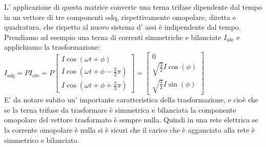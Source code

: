 \documentclass[Lau,noexaminfo]{sapthesis}
\begin{document}
	L' applicazione di questa matrice converte una terna trifase dipendente dal tempo in un vettore di tre componenti odq, rispettivamente omopolare, diretta e quadratura, che rispetto al nuovo sistema d' assi è indipendente dal tempo.\\
	Prendiamo ad esempio una terna di correnti simmetriche e bilanciate $I_{abc}$ e applichiamo la trasformazione:\\
	$I_{odq}=P I_{abc}=P \begin{bmatrix}
	I\cos(\omega t + \phi)\\
	I\cos(\omega t + \phi -\frac{2}{3}\pi) \\
	I\cos(\omega t + \phi +\frac{2}{3}\pi)
	\end{bmatrix}=
	\begin{bmatrix}
	0 \\
	\sqrt{\frac{3}{2}}I\cos(\phi)\\
	\sqrt{\frac{3}{2}}I\sin(\phi)
	\end{bmatrix}
	$\\
	E' da notare subito un' importante caratteristica della trasformazione, e cioè che se la terna trifase da trasformare è simmetrica e bilanciata la componente omopolare del vettore trasformato è sempre nulla. Quindi in una rete elettrica se la corrente omopolare è nulla si è sicuri che il carico che è agganciato alla rete è simmetrico e bilanciato.\newpage
\end{document}
